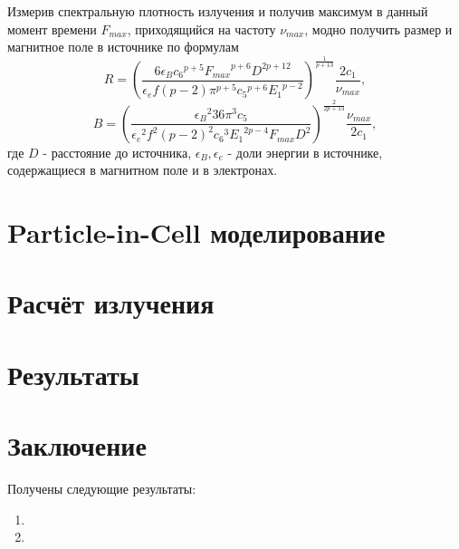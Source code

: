 Измерив спектральную плотность излучения и получив максимум в данный момент времени $F_{max}$, приходящийся на частоту $\nu_{max}$, модно получить размер и магнитное поле в источнике по формулам
\begin{equation}\label{ChevR}
R = {\left( \frac {6 \epsilon_B {c_6}^{p+5}{F_{max}}^{p+6}{
			D}^{2p+12}}{\epsilon_e f \left( p-2 \right) {\pi}^{p+5}{{c_5}}^{p+6}
		{E_1}^{p-2}} \right)} ^{ \frac{1}{p+13} } \frac{2 c_1}{\nu_{max}},
\end{equation}
\begin{equation}\label{ChevB}
B = { \left(\frac {{\epsilon_B}^2 36 {\pi}^{3}{c_5}}{{
			\epsilon_e}^{2}{f}^{2} \left( p-2 \right) ^{2}{{c_6}}^{3}{{E_1}}^{2 p-4}F_{max}{D}^{2}} \right)}
^{\frac{2}{2p+13}}\frac{\nu_{max}}{2 c_1},
\end{equation}
где $D$ - расстояние до источника, $\epsilon_B, \epsilon_e$ - доли энергии в источнике, содержащиеся в магнитном поле и в электронах.
\section{Particle-in-Cell моделирование }


\section{Расчёт излучения}




\section{Результаты}




\FloatBarrier
\section{Заключение}
 

Получены следующие результаты:
\begin{enumerate}
\item 
\item 
\end{enumerate}


\clearpage